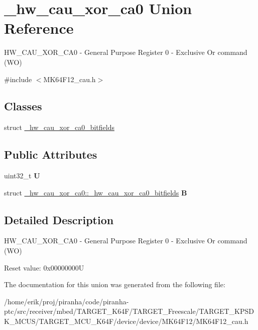 \hypertarget{union__hw__cau__xor__ca0}{}\section{\+\_\+hw\+\_\+cau\+\_\+xor\+\_\+ca0 Union Reference}
\label{union__hw__cau__xor__ca0}


H\+W\+\_\+\+C\+A\+U\+\_\+\+X\+O\+R\+\_\+\+C\+A0 -\/ General Purpose Register 0 -\/ Exclusive Or command (WO)  




{\ttfamily \#include $<$M\+K64\+F12\+\_\+cau.\+h$>$}

\subsection*{Classes}
\begin{DoxyCompactItemize}
\item 
struct \hyperlink{struct__hw__cau__xor__ca0_1_1__hw__cau__xor__ca0__bitfields}{\+\_\+hw\+\_\+cau\+\_\+xor\+\_\+ca0\+\_\+bitfields}
\end{DoxyCompactItemize}
\subsection*{Public Attributes}
\begin{DoxyCompactItemize}
\item 
uint32\+\_\+t {\bfseries U}\hypertarget{union__hw__cau__xor__ca0_abcbd2cadffe000587663157db6ea42e9}{}\label{union__hw__cau__xor__ca0_abcbd2cadffe000587663157db6ea42e9}

\item 
struct \hyperlink{struct__hw__cau__xor__ca0_1_1__hw__cau__xor__ca0__bitfields}{\+\_\+hw\+\_\+cau\+\_\+xor\+\_\+ca0\+::\+\_\+hw\+\_\+cau\+\_\+xor\+\_\+ca0\+\_\+bitfields} {\bfseries B}\hypertarget{union__hw__cau__xor__ca0_afd50f818e8bda2c7982e0febdb2f019c}{}\label{union__hw__cau__xor__ca0_afd50f818e8bda2c7982e0febdb2f019c}

\end{DoxyCompactItemize}


\subsection{Detailed Description}
H\+W\+\_\+\+C\+A\+U\+\_\+\+X\+O\+R\+\_\+\+C\+A0 -\/ General Purpose Register 0 -\/ Exclusive Or command (WO) 

Reset value\+: 0x00000000U 

The documentation for this union was generated from the following file\+:\begin{DoxyCompactItemize}
\item 
/home/erik/proj/piranha/code/piranha-\/ptc/src/receiver/mbed/\+T\+A\+R\+G\+E\+T\+\_\+\+K64\+F/\+T\+A\+R\+G\+E\+T\+\_\+\+Freescale/\+T\+A\+R\+G\+E\+T\+\_\+\+K\+P\+S\+D\+K\+\_\+\+M\+C\+U\+S/\+T\+A\+R\+G\+E\+T\+\_\+\+M\+C\+U\+\_\+\+K64\+F/device/device/\+M\+K64\+F12/M\+K64\+F12\+\_\+cau.\+h\end{DoxyCompactItemize}
